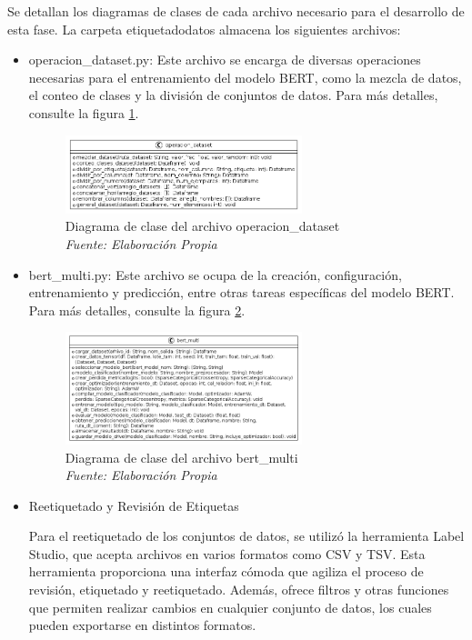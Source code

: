 Se detallan los diagramas de clases de cada archivo necesario para el desarrollo de esta fase. La carpeta etiquetadodatos almacena los siguientes archivos:

\begin{itemize}

\item operacion\_dataset.py: Este archivo se encarga de diversas operaciones necesarias para el entrenamiento del modelo BERT, como la mezcla de datos, el conteo de clases y la división de conjuntos de datos. Para más detalles, consulte la figura \ref{fig:uml5}.

\begin{figure}[h!]
	\includegraphics[width=0.65\textwidth]{capitulo5/figuras/fig5.png}
	\caption{Diagrama de clase del archivo operacion\_dataset
		\\\textit{Fuente: Elaboración Propia}}
	\label{fig:uml5}
\end{figure}

\item bert\_multi.py: Este archivo se ocupa de la creación, configuración, entrenamiento y predicción, entre otras tareas específicas del modelo BERT. Para más detalles, consulte la figura \ref{fig:uml6}.

\begin{figure}[h!]
	\includegraphics[width=0.65\textwidth]{capitulo5/figuras/fig6.png}
	\caption{Diagrama de clase del archivo bert\_multi
		\\\textit{Fuente: Elaboración Propia}}
	\label{fig:uml6}
\end{figure}


\item{Reetiquetado y Revisión de Etiquetas}

Para el reetiquetado de los conjuntos de datos, se utilizó la herramienta Label Studio, que acepta archivos en varios formatos como CSV y TSV. Esta herramienta proporciona una interfaz cómoda que agiliza el proceso de revisión, etiquetado y reetiquetado. Además, ofrece filtros y otras funciones que permiten realizar cambios en cualquier conjunto de datos, los cuales pueden exportarse en distintos formatos.

\end{itemize}

